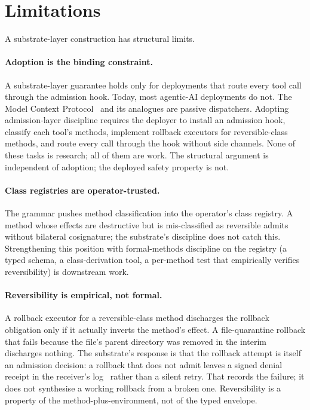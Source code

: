\section{Limitations}
\label{sec:limitations}

A substrate-layer construction has structural limits.

\paragraph{Adoption is the binding constraint.}
A substrate-layer guarantee holds only for deployments that route every tool call through the admission hook. Today, most agentic-AI deployments do not. The Model Context Protocol~\cite{anthropicMCP2024} and its analogues are passive dispatchers. Adopting admission-layer discipline requires the deployer to install an admission hook, classify each tool's methods, implement rollback executors for reversible-class methods, and route every call through the hook without side channels. None of these tasks is research; all of them are work. The structural argument is independent of adoption; the deployed safety property is not.

\paragraph{Class registries are operator-trusted.}
The grammar pushes method classification into the operator's class registry. A method whose effects are destructive but is mis-classified as reversible admits without bilateral cosignature; the substrate's discipline does not catch this. Strengthening this position with formal-methods discipline on the registry (a typed schema, a class-derivation tool, a per-method test that empirically verifies reversibility) is downstream work.

\paragraph{Reversibility is empirical, not formal.}
A rollback executor for a reversible-class method discharges the rollback obligation only if it actually inverts the method's effect. A file-quarantine rollback that fails because the file's parent directory was removed in the interim discharges nothing. The substrate's response is that the rollback attempt is itself an admission decision: a rollback that does not admit leaves a signed denial receipt in the receiver's log~\cite{programmableSovereignty2026} rather than a silent retry. That records the failure; it does not synthesise a working rollback from a broken one. Reversibility is a property of the method-plus-environment, not of the typed envelope.

